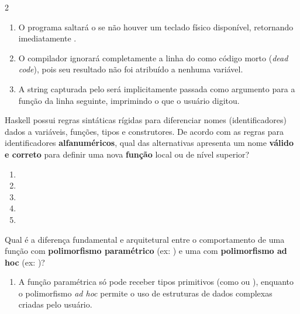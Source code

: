 \documentclass[a4paper,10pt,brazil]{article}
\begin{document}
\begin{multicols}{2}
\begin{enumerate}
  \item O programa saltará o  se não houver um teclado físico disponível, retornando imediatamente .

  \item O compilador ignorará completamente a linha do  como código morto (\emph{dead code}), pois seu resultado não foi atribuído a nenhuma variável.

  \item A string capturada pelo  será implicitamente passada como argumento para a função  da linha seguinte, imprimindo o que o usuário digitou.


\end{enumerate}

Haskell possui regras sintáticas rígidas para diferenciar nomes (identificadores) dados a variáveis, funções, tipos e construtores. De acordo com as regras para identificadores \textbf{alfanuméricos}, qual das alternativas apresenta um nome \textbf{válido e correto} para definir uma nova \textbf{função} local ou de nível superior?

\begin{enumerate}
  \item {}

  \item {}

  \item {}

  \item {}
  \item {}


\end{enumerate}

Qual é a diferença fundamental e arquitetural entre o comportamento de uma função com \textbf{polimorfismo paramétrico} (ex: ) e uma com \textbf{polimorfismo ad hoc} (ex: )?

\begin{enumerate}
  \item A função paramétrica só pode receber tipos primitivos (como  ou ), enquanto o polimorfismo \emph{ad hoc} permite o uso de estruturas de dados complexas criadas pelo usuário.


\end{enumerate}
\end{multicols}
\end{document}
